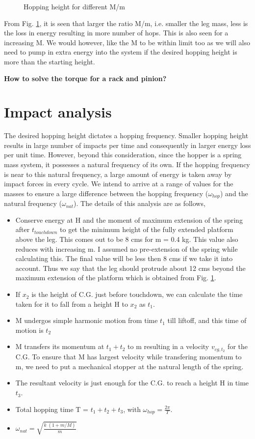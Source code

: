 \begin{figure}[!h]
\centering
\caption{Hopping height for different M/m}
\label{fig:4_hopping_height}
\end{figure}
From Fig. \ref{fig:4_hopping_height}, it is seen that larger the ratio M/m, i.e. smaller the leg
mass, less is the loss in energy resulting in more number of hops. This is also seen for a increasing M. We would however,
like the M to be within limit too as we will also need to pump in extra energy into the system if the desired hopping
height is more than the starting height.

\textbf{How to solve the torque for a rack and pinion?}

\section{Impact analysis}
\label{sec:4_impact}
The desired hopping height dictates a hopping frequency. Smaller hopping height results in large number of impacts per time
and consequently in larger energy loss per unit time. However, beyond this consideration, since the hopper is a spring mass
system, it possesses a natural frequency of its own. If the hopping frequency is near to this natural frequency, a large
amount of energy is taken away by impact forces in every cycle. We intend to arrive at a range of values for the masses
to ensure a large difference between the hopping frequency ($\omega_{hop}$) and the natural frequency ($\omega_{nat}$).
The details of this analysis are as follows,
\begin{itemize}
\item 
Conserve energy at H and the moment of maximum extension of the spring after $t_{touchdown}$ to get the minimum height of the
fully extended platform above the leg. This comes out to be 8 cms for m = 0.4 kg. This value also reduces with increasing m. I
assumed no pre-extension of the spring while calculating this. The final value will be less then 8 cms if we take it into account.
Thus we say that the leg should protrude about 12 cms beyond the maximum extension of the platform which is obtained from Fig.
\ref{fig:4_hopping_height}.
\item
If $x_2$ is the height of C.G. just before touchdown, we can calculate the time taken for it to fall from a height H to $x_2$ as
$t_1$.
\item
M undergos simple harmonic motion from time $t_1$ till liftoff, and this time of motion is $t_2$
\item
M transfers its momentum at $t_1 + t_2$ to m resulting in a velocity $v_{cg, t_{2}}$ for the C.G. To ensure that M has largest
velocity while transfering momentum to m, we need to put a mechanical stopper at the natural length of the spring.
\item
The resultant velocity is just enough for the C.G. to reach a height H in time $t_3$.
\item
Total hopping time T = $t_1 + t_2 + t_3$, with $\omega_{hop} = \frac{2\pi}{T}$.
\item
$\omega_{nat} = \sqrt{\frac{k\;(1+m/M)}{m}}$
\end{itemize}


